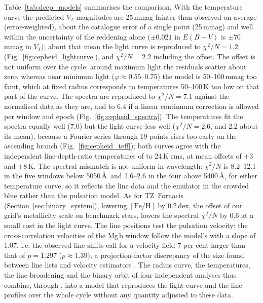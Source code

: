 Table~\ref{tab:dcep_models} summarises the comparison. With the \citet{trahin2021} temperature curve the
predicted $V_T$ magnitudes are 25\,mmag fainter than observed on average (error-weighted), about the
catalogue error of a single point (25\,mmag) and well within the uncertainty of the reddening alone
($\pm0.021$ in $E(B-V)$ is $\pm70$\,mmag in $V_T$); about that mean the light curve is reproduced to
$\chi^2/N = 1.2$ (Fig.~\ref{fig:cepheid_lightcurve}), and $\chi^2/N = 2.2$ including the offset. The offset
is not uniform over the cycle: around maximum light the residuals scatter about zero, whereas near minimum
light ($\varphi \approx 0.55$--0.75) the model is 50--100\,mmag too faint, which at fixed radius corresponds
to temperatures 50--100\,K too low on that part of the curve. The spectra are reproduced to
$\chi^2/N = 7.1$ against the normalised data as they are, and to 6.4 if a linear continuum correction is
allowed per window and epoch (Fig.~\ref{fig:cepheid_spectra}). The \citet{luck2018} temperatures fit the
spectra equally well (7.0) but the light curve less well ($\chi^2/N = 2.6$, and 2.2 about its mean),
because a Fourier series through 19 points rises too early on the ascending branch
(Fig.~\ref{fig:cepheid_teff}); both curves agree with the independent line-depth-ratio temperatures of
\citet{andrievsky2005} to 24\,K rms, at mean offsets of $+3$ and $+8$\,K. The spectral mismatch is not
uniform in wavelength: $\chi^2/N$ is 8.2--12.1 in the five windows below 5050\,\AA\ and 1.6--2.6 in the four
above 5400\,\AA, for either temperature curve, so it reflects the line data and the emulator in the crowded
blue rather than the pulsation model. As for TZ~Fornacis (Section~\ref{sec:binary_system}), lowering
$[\mathrm{Fe/H}]$ by 0.2\,dex, the offset of our grid's metallicity scale on benchmark stars, lowers the
spectral $\chi^2/N$ by 0.6 at a small cost in the light curve. The line positions test the pulsation
velocity: the cross-correlation velocities of the Mg\,b window follow the model's with a slope of 1.07,
i.e. the observed line shifts call for a velocity field 7 per cent larger than that of $p = 1.297$
($p \approx 1.39$), a projection-factor discrepancy of the size found between line lists and velocity
estimators \citep{nardetto2017harps}. The radius curve, the temperatures, the line broadening and the
binary orbit of four independent analyses thus combine, through \spice, into a model that reproduces the
light curve and the line profiles over the whole cycle without any quantity adjusted to these data.

